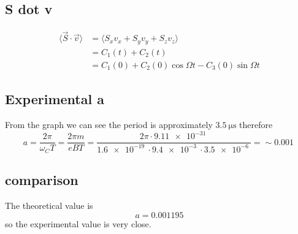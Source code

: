 \subsection{S dot v}
\begin{align}
	\langle\vec{S}\cdot\vec{v}\rangle &= \langle S_x v_x + S_y v_y + S_z v_z \rangle \\
	&= C_1(t) + C_2(t) \\
	&= C_1(0) + C_2(0)\cos\Omega t - C_3(0)\sin\Omega t
\end{align}
\subsection{Experimental a}
From the graph we can see the period is approximately \(\qty{3.5}{\micro\second}\) therefore
\begin{equation}
	a = \frac{2\pi}{\omega_C T} = \frac{2\pi m}{eBT} = \frac{2\pi \cdot \qty{9.11e-31}{}}{\qty{1.6e-19}{}\cdot\qty{9.4e-3}{}\cdot\qty{3.5e-6}{}} = \sim \qty{0.001}{}
\end{equation}
\subsection{comparison}
The theoretical value is
\begin{equation}
	a = 0.001195
\end{equation}
so the experimental value is very close.